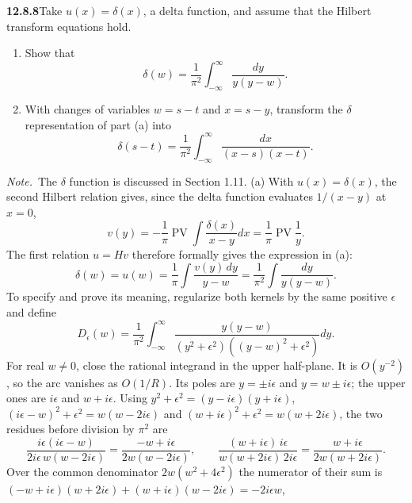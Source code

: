 \par\bigskip
\noindent\textbf{12.8.8}\quad Take $u(x)=\delta(x)$, a delta function, and
assume that the Hilbert transform equations hold.
\begin{enumerate}
\item[(a)] Show that
  \[
  \delta(w)=\frac{1}{\pi^{2}}\int_{-\infty}^{\infty}\frac{dy}{y(y-w)}.
  \]
\item[(b)] With changes of variables $w=s-t$ and $x=s-y$, transform the
  $\delta$ representation of part (a) into
  \[
  \delta(s-t)=\frac{1}{\pi^{2}}
  \int_{-\infty}^{\infty}\frac{dx}{(x-s)(x-t)}.
  \]
\end{enumerate}
\emph{Note.}~The $\delta$ function is discussed in Section 1.11.
\solution
{}
(a) With $u(x)=\delta(x)$, the second Hilbert relation gives, since the
delta function evaluates $1/(x-y)$ at $x=0$,
\[
v(y)=-\frac1\pi\operatorname{PV}\int\frac{\delta(x)}{x-y}dx
=\frac1\pi\operatorname{PV}\frac1y.
\]
The first relation $u=Hv$ therefore formally gives the expression in
(a):
\[
\delta(w)=u(w)=\frac1\pi\int\frac{v(y)\,dy}{y-w}
=\frac1{\pi^2}\int\frac{dy}{y(y-w)}.
\]
To specify and prove its meaning, regularize both kernels by the
same positive $\epsilon$ and define
\[
D_\epsilon(w)=\frac1{\pi^2}\int_{-\infty}^{\infty}
\frac{y(y-w)}{(y^2+\epsilon^2)((y-w)^2+\epsilon^2)}dy.
\]
For real $w\ne0$, close the rational integrand in the upper half-plane.
It is $O(y^{-2})$, so the arc vanishes as $O(1/R)$. Its poles are
$y=\pm i\epsilon$ and $y=w\pm i\epsilon$; the upper ones are
$i\epsilon$ and $w+i\epsilon$. Using
$y^2+\epsilon^2=(y-i\epsilon)(y+i\epsilon)$,
$(i\epsilon-w)^2+\epsilon^2=w(w-2i\epsilon)$ and
$(w+i\epsilon)^2+\epsilon^2=w(w+2i\epsilon)$, the two residues before
division by $\pi^2$ are
\[
\frac{i\epsilon(i\epsilon-w)}{2i\epsilon\,w(w-2i\epsilon)}
=\frac{-w+i\epsilon}{2w(w-2i\epsilon)},\qquad
\frac{(w+i\epsilon)\,i\epsilon}{w(w+2i\epsilon)\,2i\epsilon}
=\frac{w+i\epsilon}{2w(w+2i\epsilon)}.
\]
Over the common denominator $2w(w^2+4\epsilon^2)$ the numerator of
their sum is
$(-w+i\epsilon)(w+2i\epsilon)+(w+i\epsilon)(w-2i\epsilon)=-2i\epsilon w$,
